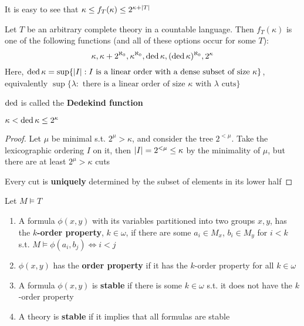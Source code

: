 \documentclass[11pt]{article}
\begin{document}
It is easy to see that \(\kappa\le f_T(\kappa)\le 2^{\kappa+\abs{T}}\)

\begin{fact}
Let \(T\) be an arbitrary complete theory in a countable language. Then \(f_T(\kappa)\) is one of the
following functions (and all of these options occur for some \(T\)):
\begin{equation*}
\kappa,\kappa+2^{\aleph_0},\kappa^{\aleph_0},\operatorname{ded}\kappa,(\operatorname{ded}\kappa)^{\aleph_0},2^\kappa
\end{equation*}
Here, \(\ded\kappa=\sup\{\abs{I}:I\text{ is a linear order with a dense subset of size }\kappa\}\),
equivalently \(\sup\{\lambda:\text{ there is a linear order of size $\kappa$ with $\lambda$ cuts}\}\)
\end{fact}

\(\operatorname{ded}\) is called the \textbf{Dedekind function}

\begin{lemma}[]
\(\kappa<\operatorname{ded}\kappa\le 2^\kappa\)
\end{lemma}

\begin{proof}
Let \(\mu\) be minimal s.t. \(2^\mu>\kappa\), and consider the tree \(2^{<\mu}\). Take the lexicographic
ordering \(I\) on it, then \(\abs{I}=2^{<\mu}\le\kappa\) by the minimality of \(\mu\), but there are at
least \(2^\mu>\kappa\) cuts

Every cut is \textbf{uniquely} determined by the subset of elements in its lower half
\end{proof}

\begin{definition}[]
Let \(M\vDash T\)
\begin{enumerate}
\item A formula \(\phi(x,y)\) with its variables partitioned into two groups \(x,y\), has the
\textbf{\(k\)-order property}, \(k\in\omega\), if there are some \(a_i\in M_x\), \(b_i\in M_y\) for \(i<k\)
s.t. \(M\vDash\phi(a_i,b_j)\Leftrightarrow i<j\)
\item \(\phi(x,y)\) has the \textbf{order property} if it has the \(k\)-order property for all \(k\in\omega\)
\item A formula \(\phi(x,y)\) is \textbf{stable} if there is some \(k\in\omega\) s.t. it does not have the \(k\)-order property
\item A theory is \textbf{stable} if it implies that all formulas are stable
\end{enumerate}
\end{definition}
\end{document}
